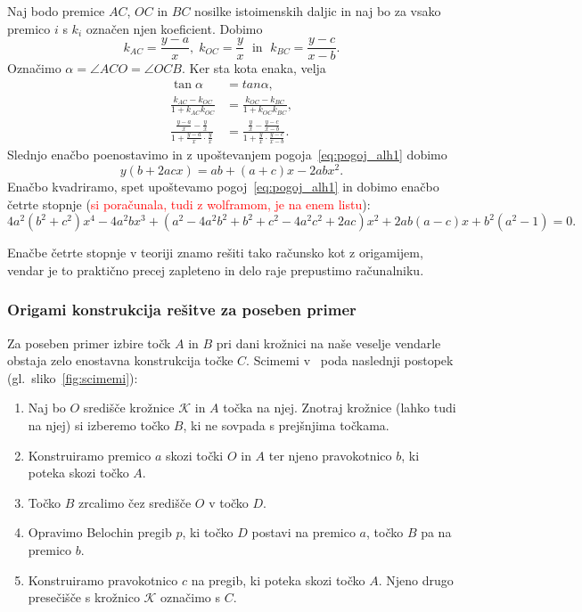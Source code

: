 Naj bodo premice $AC$, $OC$ in $BC$ nosilke istoimenskih daljic in naj bo za vsako premico $i$ s $k_i$ označen njen koeficient. Dobimo
$$ k_{AC} = \frac{y-a}{x}, \; k_{OC} = \frac{y}{x} \; \text{ in } \; k_{BC} = \frac{y-c}{x-b}.$$
Označimo $\alpha = \angle ACO = \angle OCB$. Ker sta kota enaka, velja
\begin{align*}
    \tan \alpha &= tan \alpha, \\
    \frac{k_{AC} - k_{OC}}{1 + k_{AC} k_{OC}} &= \frac{k_{OC} - k_{BC}}{1 + k_{OC} k_{BC}}, \\
    \frac{\frac{y-a}{x} - \frac{y}{x}}{1 + \frac{y-a}{x} \cdot \frac{y}{x}} &= \frac{\frac{y}{x} - \frac{y-c}{x-b}}{1 + \frac{y}{x} \cdot \frac{y-c}{x-b}}.
\end{align*}
Slednjo enačbo poenostavimo in z upoštevanjem pogoja~\eqref{eq:pogoj_alh1} dobimo
$$ y(b + 2acx) = ab + (a+c)x - 2abx^2.$$
Enačbo kvadriramo, spet upoštevamo pogoj~\eqref{eq:pogoj_alh1} in dobimo enačbo četrte stopnje (\textcolor{red}{si poračunala, tudi z wolframom, je na enem listu}):
$$ 4a^2(b^2 + c^2)x^4 - 4a^2bx^3 + (a^2 - 4a^2b^2 + b^2 + c^2 - 4a^2c^2 + 2ac)x^2 + 2ab(a-c)x + b^2(a^2-1) = 0.$$

Enačbe četrte stopnje v teoriji znamo rešiti tako računsko kot z origamijem, vendar je to praktično precej zapleteno in delo raje prepustimo računalniku.

\subsubsection*{Origami konstrukcija rešitve za poseben primer}

Za poseben primer izbire točk $A$ in $B$ pri dani krožnici na naše veselje vendarle obstaja zelo enostavna konstrukcija točke $C$. Scimemi v~\cite[str.\ 116-117]{scimemi2002} poda naslednji postopek (gl.\ sliko~\ref{fig:scimemi}):
\begin{enumerate}
    \item Naj bo $O$ središče krožnice $\mathcal{K}$ in $A$ točka na njej. Znotraj krožnice (lahko tudi na njej) si izberemo točko $B$, ki ne sovpada s prejšnjima točkama.
    \item Konstruiramo premico $a$ skozi točki $O$ in $A$ ter njeno pravokotnico $b$, ki poteka skozi točko $A$.
    \item Točko $B$ zrcalimo čez središče $O$ v točko $D$.
    \item Opravimo Belochin pregib $p$, ki točko $D$ postavi na premico $a$, točko $B$ pa na premico $b$.
    \item Konstruiramo pravokotnico $c$ na pregib, ki poteka skozi točko $A$. Njeno drugo presečišče s krožnico $\mathcal{K}$ označimo s $C$.
\end{enumerate}


